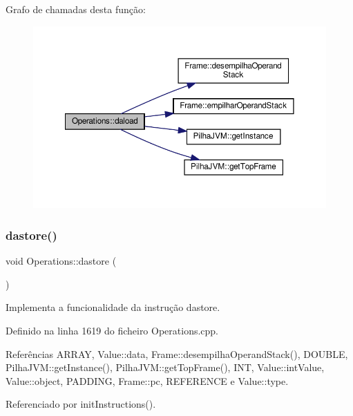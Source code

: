 Grafo de chamadas desta função\+:\nopagebreak
\begin{figure}[H]
\begin{center}
\leavevmode
\includegraphics[width=350pt]{classOperations_a63691de547749780c372e285bd6a97bc_cgraph}
\end{center}
\end{figure}
\mbox{\label{classOperations_a9735fdb8ba4ea2d7b8b32e8d0a5d2f72}} 
\subsubsection{\texorpdfstring{dastore()}{dastore()}}
{\footnotesize\ttfamily void Operations\+::dastore (\begin{DoxyParamCaption}{ }\end{DoxyParamCaption})\hspace{0.3cm}{\ttfamily [private]}}



Implementa a funcionalidade da instrução dastore. 



Definido na linha 1619 do ficheiro Operations.\+cpp.



Referências A\+R\+R\+AY, Value\+::data, Frame\+::desempilha\+Operand\+Stack(), D\+O\+U\+B\+LE, Pilha\+J\+V\+M\+::get\+Instance(), Pilha\+J\+V\+M\+::get\+Top\+Frame(), I\+NT, Value\+::int\+Value, Value\+::object, P\+A\+D\+D\+I\+NG, Frame\+::pc, R\+E\+F\+E\+R\+E\+N\+CE e Value\+::type.



Referenciado por init\+Instructions().

